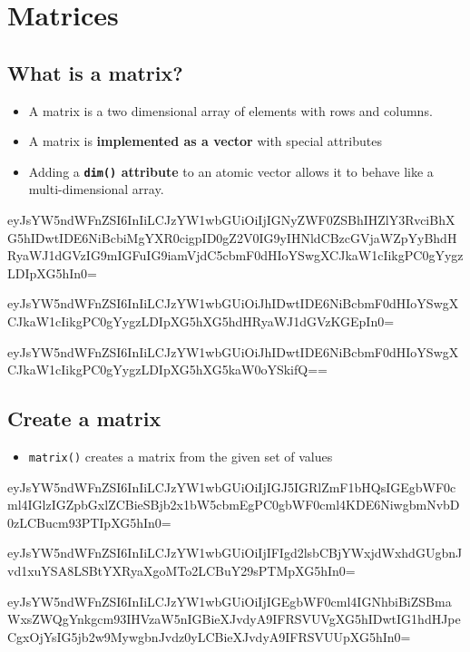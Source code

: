 \documentclass[]{book}
\providecommand{\tightlist}{%
  \setlength{\itemsep}{0pt}\setlength{\parskip}{0pt}}
\begin{document}
\hypertarget{matrices}{%
\section{Matrices}\label{matrices}}

\hypertarget{what-is-a-matrix}{%
\subsection{What is a matrix?}\label{what-is-a-matrix}}

\begin{itemize}
\tightlist
\item
  A matrix is a two dimensional array of elements with rows and columns.
\item
  A matrix is \textbf{implemented as a vector} with special attributes
\item
  Adding a \textbf{\texttt{dim()} attribute} to an atomic vector allows it to behave like a multi-dimensional array.
\end{itemize}

eyJsYW5ndWFnZSI6InIiLCJzYW1wbGUiOiIjIGNyZWF0ZSBhIHZlY3RvciBhXG5hIDwtIDE6NiBcbiMgYXR0cigpID0gZ2V0IG9yIHNldCBzcGVjaWZpYyBhdHRyaWJ1dGVzIG9mIGFuIG9iamVjdC5cbmF0dHIoYSwgXCJkaW1cIikgPC0gYygzLDIpXG5hIn0=

eyJsYW5ndWFnZSI6InIiLCJzYW1wbGUiOiJhIDwtIDE6NiBcbmF0dHIoYSwgXCJkaW1cIikgPC0gYygzLDIpXG5hXG5hdHRyaWJ1dGVzKGEpIn0=

eyJsYW5ndWFnZSI6InIiLCJzYW1wbGUiOiJhIDwtIDE6NiBcbmF0dHIoYSwgXCJkaW1cIikgPC0gYygzLDIpXG5hXG5kaW0oYSkifQ==

\hypertarget{create-a-matrix}{%
\subsection{Create a matrix}\label{create-a-matrix}}

\begin{itemize}
\tightlist
\item
  \texttt{matrix()} creates a matrix from the given set of values
\end{itemize}

eyJsYW5ndWFnZSI6InIiLCJzYW1wbGUiOiIjIGJ5IGRlZmF1bHQsIGEgbWF0cml4IGlzIGZpbGxlZCBieSBjb2x1bW5cbmEgPC0gbWF0cml4KDE6NiwgbmNvbD0zLCBucm93PTIpXG5hIn0=

eyJsYW5ndWFnZSI6InIiLCJzYW1wbGUiOiIjIFIgd2lsbCBjYWxjdWxhdGUgbnJvd1xuYSA8LSBtYXRyaXgoMTo2LCBuY29sPTMpXG5hIn0=

eyJsYW5ndWFnZSI6InIiLCJzYW1wbGUiOiIjIGEgbWF0cml4IGNhbiBiZSBmaWxsZWQgYnkgcm93IHVzaW5nIGBieXJvdyA9IFRSVUVgXG5hIDwtIG1hdHJpeCgxOjYsIG5jb2w9MywgbnJvdz0yLCBieXJvdyA9IFRSVUUpXG5hIn0=
\end{document}
